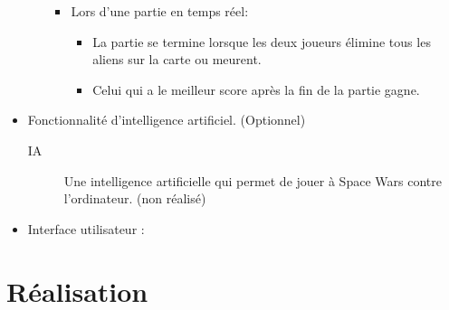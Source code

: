 \documentclass[french, 11pt]{report}
\begin{document}
\begin{itemize}
\begin{itemize}
\begin{itemize}
\begin{itemize}
					\end{itemize}
					\item Lors d'une partie en temps réel:
					\begin{itemize}
						\item La partie se termine lorsque les deux joueurs élimine tous les aliens sur la carte ou meurent.
						\item Celui qui a le meilleur score après la fin de la partie gagne.
					\end{itemize}
				\end{itemize}
			\end{itemize}
			\item Fonctionnalité d’intelligence artificiel. (Optionnel)
			\begin{description}
				\item[IA] Une intelligence artificielle qui permet de jouer à Space Wars contre l'ordinateur. (non réalisé)
			\end{description}
			\item Interface utilisateur :
		\end{itemize}
	\chapter{Réalisation}
\end{document}

